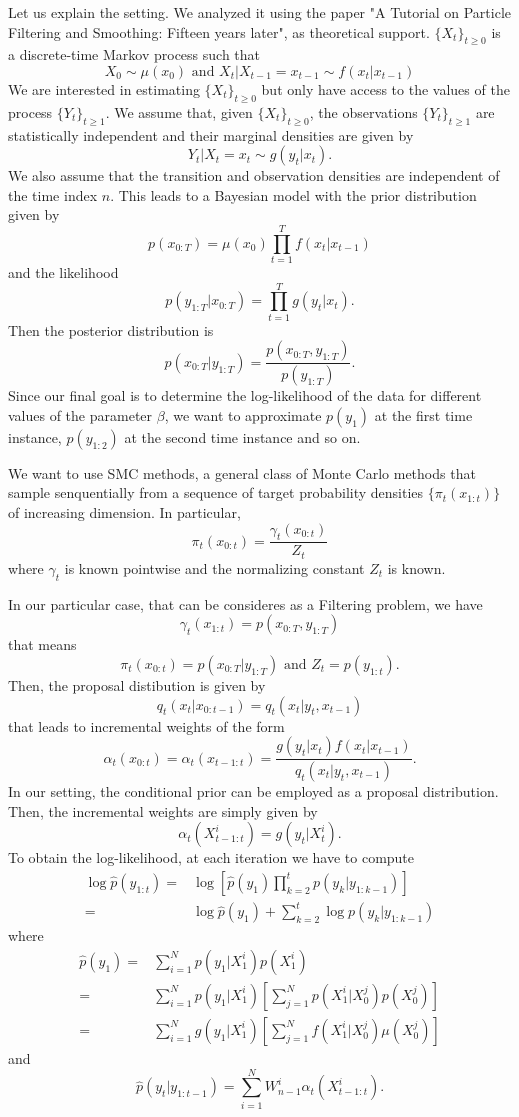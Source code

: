 \documentclass[]{article}
\begin{document}
	Let us explain the setting. We analyzed it using the paper "A Tutorial on Particle Filtering and Smoothing: Fifteen years later", as theoretical support. $\{X_t\}_{t\geq0}$ is a discrete-time Markov process such that 
	$$
	X_0 \sim \mu(x_0) \text{ and } X_t|X_{t-1} = x_{t-1} \sim f(x_t|x_{t-1})
	$$
	We are interested in estimating $\{X_t\}_{t\geq0}$ but only have access to the values of the process $\{Y_t\}_{t\geq1}$. We assume that, given $\{X_t\}_{t\geq0}$, the observations $\{Y_t\}_{t\geq1}$ are statistically independent and their marginal densities are given by
	$$
	Y_t|X_t = x_t \sim g(y_t|x_t).
	$$
	We also assume that the transition and observation densities are independent of the time index $n$. This leads to a Bayesian model with the prior distribution given by 
	$$
	p(x_{0:T}) = \mu(x_0)\prod_{t=1}^{T}f(x_t|x_{t-1})
	$$
	and the likelihood
	$$
	p(y_{1:T}|x_{0:T}) = \prod_{t=1}^{T}g(y_t|x_t).
	$$
	Then the posterior distribution is
	$$
	p(x_{0:T}|y_{1:T}) = \frac{p(x_{0:T},y_{1:T})}{p(y_{1:T})}.
	$$
	Since our final goal is to determine the log-likelihood of the data for different values of the parameter $\beta$, we want to approximate $p(y_1)$ at the first time instance, $p(y_{1:2})$ at the second time instance and so on.
	
	We want to use SMC methods, a general class of Monte Carlo methods that sample senquentially from a sequence of target probability densities $\{ \pi_t(x_{1:t}) \}$ of increasing dimension. In particular, 
	$$
	\pi_t(x_{0:t}) = \frac{\gamma_t(x_{0:t})}{Z_t}
	$$
	where 
	$\gamma_t$ is known pointwise and the normalizing constant $Z_t$ is known.
	
	In our particular case, that can be consideres as a Filtering problem, we have
	$$
	\gamma_t(x_{1:t}) = p(x_{0:T},y_{1:T})
	$$ 
	that means
	$$
	\pi_t(x_{0:t}) = p(x_{0:T}|y_{1:T}) \text{ and } Z_t = p(y_{1:t}).
	$$
	Then, the proposal distibution is given by 
	$$
	q_t(x_t|x_{0:t-1}) = q_t(x_t|y_t, x_{t-1})
	$$
	that leads to incremental weights of the form
	$$
	\alpha_t(x_{0:t}) = \alpha_t(x_{t-1:t}) = \frac{g(y_t|x_t)f(x_t|x_{t-1})}{q_t(x_t|y_t, x_{t-1})}.  
	$$
	In our setting, the conditional prior can be employed as a proposal distribution. Then, the incremental weights are simply given by
	$$
	\alpha_t(X_{t-1:t}^i) = g(y_t|X_t^i).
	$$
	To obtain the log-likelihood, at each iteration we have to compute
	\begin{align*}
	\log\hat{p}(y_{1:t}) = & \log[ \hat{p}(y_1) \prod_{k=2}^{t} p(y_k|y_{1:k-1})] \\
	= & \log \hat{p}(y_1) + \sum_{k=2}^{t} \log p(y_k|y_{1:k-1})
	\end{align*}
	where
	\begin{align*}
	\hat{p}(y_1) = & \sum_{i=1}^{N} p(y_1|X_1^i)p(X_1^i) \\
	= & \sum_{i=1}^{N} p(y_1|X_1^i)[\sum_{j=1}^{N}p(X_1^i|X_0^j)p(X_0^j)] \\
	= & \sum_{i=1}^{N} g(y_1|X_1^i)[\sum_{j=1}^{N}f(X_1^i|X_0^j)\mu(X_0^j)]
	\end{align*}
	and
	$$
	\hat{p}(y_t|y_{1:t-1}) = \sum_{i=1}^{N}W_{n-1}^i\alpha_t(X_{t-1:t}^i).
	$$
	
\end{document}
